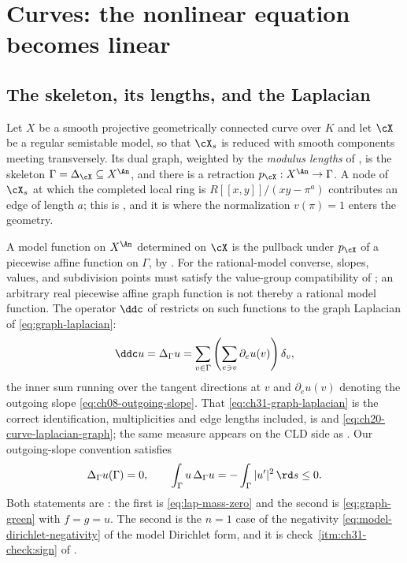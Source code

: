 \section{Curves: the nonlinear equation becomes linear}
\label{sec:ch31-curves}

\subsection{The skeleton, its lengths, and the Laplacian}
\label{sec:ch31-curve-setup}

Let \(X\) be a smooth projective geometrically connected curve over
\(K\) and let \(\cX\) be a
regular semistable model, so that \(\cX_s\) is reduced with smooth
components meeting transversely.  Its dual graph, weighted by the
\emph{modulus lengths} of , is the skeleton
\(\Gamma=\Delta_{\cX}\subseteq X^{\An}\), and there is a retraction
\(p_{\cX}:X^{\An}\to\Gamma\).  A node of \(\cX_s\) at which the completed
local ring is \(R[[x,y]]/(xy-\pi^{a})\) contributes an edge of length \(a\);
this is , and it is where the normalization
\(v(\pi)=1\) enters the geometry.

A model function on \(X^{\An}\) determined on \(\cX\) is the pullback under
\(p_{\cX}\) of a piecewise affine function on \(\Gamma\), by
.  For the rational-model
converse, slopes, values, and subdivision points must satisfy the
value-group compatibility of \cite[Proposition~3.5]{GJKM19}; an arbitrary
real piecewise affine graph function is not thereby a rational model
function.  The operator \(\ddc\) of
 restricts on such functions to the graph Laplacian of
\eqref{eq:graph-laplacian}:
\begin{equation}
              \ddc u=\Delta_\Gamma u
              =\sum_{v\in\Gamma}
                 \left(\sum_{e\ni v}\partial_eu(v)\right)\delta_v ,
\label{eq:ch31-graph-laplacian}
\end{equation}
the inner sum running over the tangent directions at \(v\) and
\(\partial_e u(v)\) denoting the outgoing slope
\eqref{eq:ch08-outgoing-slope}.  That \eqref{eq:ch31-graph-laplacian} is the
correct identification, multiplicities and edge lengths included, is
 and \eqref{eq:ch20-curve-laplacian-graph};
the same measure appears on the CLD side as
.  Our outgoing-slope convention
satisfies
\begin{equation}
           \Delta_\Gamma u(\Gamma)=0,
           \qquad
           \int_\Gamma u\,\Delta_\Gamma u
                    =-\int_\Gamma|u'|^2\,\rd s\leq0 .
\label{eq:graph-dirichlet-sign}
\end{equation}
Both statements are : the first is
\eqref{eq:lap-mass-zero} and the second is \eqref{eq:graph-green} with
\(f=g=u\).  The second is the \(n=1\) case of the negativity
\eqref{eq:model-dirichlet-negativity} of the model Dirichlet form, and it is
check~\cref{itm:ch31-check:sign} of .

